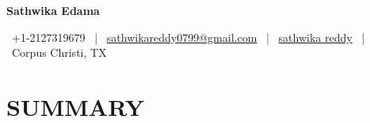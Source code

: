 \documentclass[a4paper,11pt]{article}
\newcommand{\headerfontiii}{\fontfamily{ppl}\selectfont} %
\begin{document}
\headerfontiii

\begin{center}
    {\Huge\textbf{Sathwika Edama}}
\end{center}
\vspace{-6mm}

\begin{center}
    \footnotesize{
    \faPhone\ +1-2127319679 \ | \faEnvelope\ \href{mailto:sathwikareddy0799@gmail.com}{sathwikareddy0799@gmail.com} \ |
    \faGithub \ \href{https://github.com/sedama29}{sathwika reddy} \ | 
    \faMapMarker \ Corpus Christi, TX
    }
\end{center}


\vspace{-4mm}

\section{\textbf{SUMMARY }}
\vspace{1mm}
\end{document}
